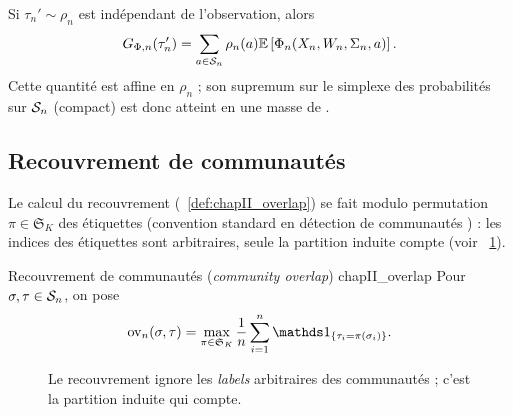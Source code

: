 \begin{Preuve}
Si $\tau_n'\sim\rho_n$ est indépendant de l'observation, alors
\[
    G_{\Phi,n}(\tau_n')
    =
    \sum_{a\in\mathcal S_n}\rho_n(a)
    \mathbb E\left[\Phi_n(X_n,W_n,\Sigma_n,a)\right].
\]
Cette quantité est affine en $\rho_n$ ; son supremum sur le simplexe des probabilités sur $\mathcal S_n$ (compact) est donc atteint en une masse de . 
\end{Preuve}

\subsection{Recouvrement de communautés}

Le calcul du recouvrement (\Def~\ref{def:chapII_overlap}) se fait modulo permutation $\pi\in {\mathfrak{S}}_K$ des étiquettes (convention standard en détection de communautés \cite{Abbe2017}) : les indices des étiquettes sont arbitraires, seule la partition induite compte (voir \Fig~\ref{fig:chapII_overlap}).

\begin{Definition}{Recouvrement de communautés (\emph{community overlap}) \cite{Abbe2017,SankararamanBaccelli2018}}{chapII_overlap}
Pour $\sigma,\tau\in\mathcal S_n$, on pose
\begin{equation}
    \ov_n(\sigma,\tau)
    =
    \max_{\pi\in\mathfrak S_K}
    \frac1n\sum_{i=1}^n \ind{\tau_i=\pi(\sigma_i)}.
    \label{eq:chapII_overlap}
\end{equation}
\end{Definition}
\begin{figure}[H]
\centering
{}
\caption{Le recouvrement ignore les \emph{labels} arbitraires des communautés ; c'est la partition induite qui compte.}
\label{fig:chapII_overlap}
\end{figure}

